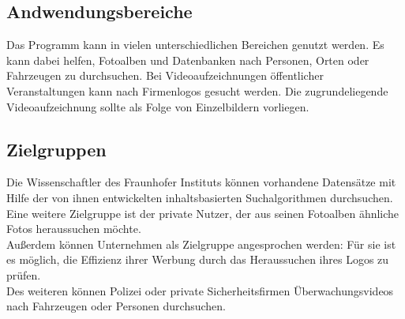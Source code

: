 \subsection{Andwendungsbereiche}

Das Programm kann in vielen unterschiedlichen Bereichen genutzt werden. Es kann dabei helfen, Fotoalben und Datenbanken nach Personen, Orten oder Fahrzeugen zu durchsuchen. Bei Videoaufzeichnungen öffentlicher Veranstaltungen kann nach Firmenlogos gesucht werden. Die zugrundeliegende Videoaufzeichnung sollte als Folge von Einzelbildern vorliegen.

\subsection{Zielgruppen}

Die Wissenschaftler des Fraunhofer Instituts können vorhandene Datensätze mit Hilfe der von ihnen entwickelten inhaltsbasierten Suchalgorithmen durchsuchen.\\
Eine weitere Zielgruppe ist der private Nutzer, der aus seinen Fotoalben ähnliche Fotos heraussuchen möchte.\\
Außerdem können Unternehmen als Zielgruppe angesprochen werden: Für sie ist es möglich, die Effizienz ihrer Werbung durch das Heraussuchen ihres Logos zu prüfen.\\
Des weiteren können Polizei oder private Sicherheitsfirmen Überwachungsvideos nach Fahrzeugen oder Personen durchsuchen.
\pagebreak